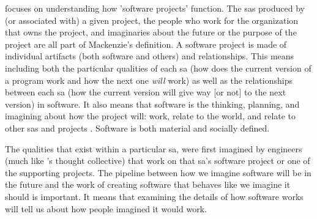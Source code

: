 \documentclass[a4paper,man,natbib,floatsintext]{apa6}
\begin{document}
  \citet{Mackenzie2006-hb} focuses on understanding how 'software projects' function. The \glspl{sa} produced by (or associated with) a given project, the people who work for the organization that owns the project, and imaginaries  about the future or the purpose of the project are all part of Mackenzie's definition. A software project is made of individual artifacts (both software and others) and relationships. This means including both the particular qualities of each \gls{sa} (how does the current version of a program work and how the next one \textit{will} work) as well as the relationships between each \gls{sa} (how the current version will give way [or not] to the next version) in software. It also means that software is the thinking, planning, and imagining about how the project will: work, relate to the world, and relate to other \glspl{sa} and projects \citep{Mackenzie2006-hb}. Software is both material and socially defined. 

  The qualities that exist within a particular \gls{sa}, were first imagined by engineers (much like \citet{Fleck2012-qr}'s thought collective) that work on that \gls{sa}'s software project or one of the supporting projects. The pipeline between how we imagine software will be in the future and the work of creating software that behaves like we imagine it should is important. It means that examining the details of how software works will tell us about how people imagined it would work.


  
\end{document}
